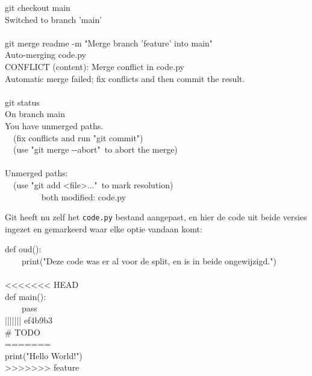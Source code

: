 \begin{bash}
 git checkout main\\
Switched to branch 'main' \\
~ \\
 git merge readme -m "Merge branch 'feature' into main" \\
Auto-merging code.py \\
CONFLICT (content): Merge conflict in code.py \\
Automatic merge failed; fix conflicts and then commit the result. \\
~ \\
 git status \\
On branch main \\
You have unmerged paths. \\
\ \ (fix conflicts and run "git commit") \\
\ \ (use "git merge -\!-abort"\ to abort the merge) \\
~ \\
Unmerged paths: \\
\ \ (use "git add <file>..."\ to mark resolution) \\
\ \ \ \ \ \ \ \ {\color{ttred} both modified:   code.py } \\
\end{bash}

Git heeft nu zelf het \texttt{code.py} bestand aangepast, en hier de code uit beide versies ingezet en gemarkeerd waar elke optie vandaan komt:

\begin{bash}
{\color{ttgrey} def oud(): \\
\ \ \ \ print("Deze code was er al voor de split, en is in beide ongewijzigd.") } \\
~ \\
<\!<\!<\!<\!<\!<\!< HEAD \\
{\color{ttred} def main(): \\
\ \ \ \ pass } \\
||||||| ef4b9b3 \\
{\color{ttgreen} \# TODO} \\
======= \\
{\color{ttblue} print("Hello World!") } \\
>\!>\!>\!>\!>\!>\!> feature \\
\end{bash}

